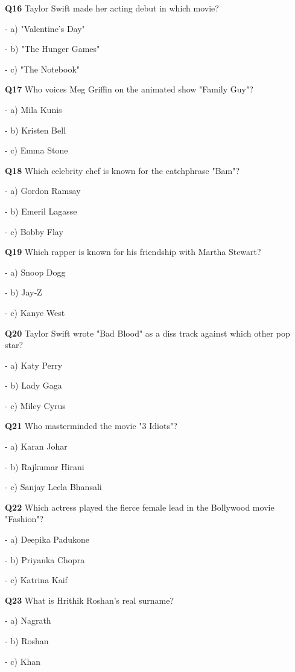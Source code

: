 \textbf{Q16} Taylor Swift made her acting debut in which movie?\par
\quad - a) "Valentine's Day"\par
\quad - b) "The Hunger Games"\par
\quad - c) "The Notebook"\par

\textbf{Q17} Who voices Meg Griffin on the animated show "Family Guy"?\par
\quad - a) Mila Kunis\par
\quad - b) Kristen Bell\par
\quad - c) Emma Stone\par

\textbf{Q18} Which celebrity chef is known for the catchphrase "Bam"?\par
\quad - a) Gordon Ramsay\par
\quad - b) Emeril Lagasse\par
\quad - c) Bobby Flay\par

\textbf{Q19} Which rapper is known for his friendship with Martha Stewart?\par
\quad - a) Snoop Dogg\par
\quad - b) Jay‑Z\par
\quad - c) Kanye West\par

\textbf{Q20} Taylor Swift wrote "Bad Blood" as a diss track against which other pop star?\par
\quad - a) Katy Perry\par
\quad - b) Lady Gaga\par
\quad - c) Miley Cyrus\par

\textbf{Q21} Who masterminded the movie "3 Idiots"?\par
\quad - a) Karan Johar\par
\quad - b) Rajkumar Hirani\par
\quad - c) Sanjay Leela Bhansali\par

\textbf{Q22} Which actress played the fierce female lead in the Bollywood movie "Fashion"?\par
\quad - a) Deepika Padukone\par
\quad - b) Priyanka Chopra\par
\quad - c) Katrina Kaif\par

\textbf{Q23} What is Hrithik Roshan's real surname?\par
\quad - a) Nagrath\par
\quad - b) Roshan\par
\quad - c) Khan\par

